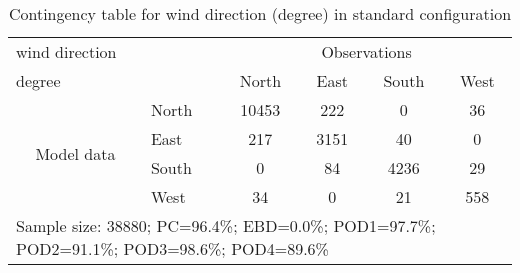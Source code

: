 \documentclass[11pt,english]{article}
\begin{document}
\begin{table}[]
\begin{center}
\begin{tabular}{llcccc}
\hline
{wind direction}                                       &                                                    & \multicolumn{4}{c}{Observations}                 \\
{degree}                                       &                             & {North}   & {East} & {South} & {West} \\
\hline
\multicolumn{1}{c}{\multirow{4}{*}{Model data}}  & {North}              & 10453                & 222                       & 0              & 36\\
                                                 & {East}               & 217                & 3151                       & 40              & 0\\
                                                 & {South}              & 0                & 84                      & 4236             & 29\\
                                                 & {West}               & 34               & 0                      & 21             & 558\\
\hline 
\multicolumn{6}{l}{Sample size: 38880; PC=96.4\%; EBD=0.0\%; POD1=97.7\%; POD2=91.1\%; POD3=98.6\%; POD4=89.6\%}                 \\
\end{tabular}
\end{center}
\caption{Contingency table for {wind direction} (degree) in standard configuration}
\label{tab:contingencywdAFT}
\end{table}

\newpage
\end{document}
